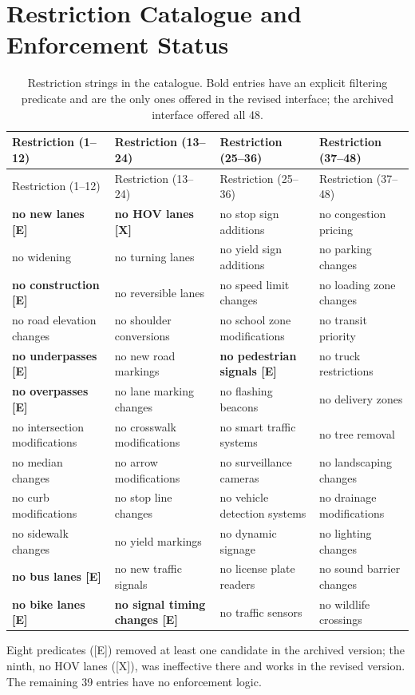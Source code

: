 \documentclass[11pt]{article}
\begin{document}
\section{Restriction Catalogue and Enforcement Status}
\setcounter{table}{0}
\begin{longtable}{P{0.21\textwidth} P{0.21\textwidth} P{0.21\textwidth} P{0.21\textwidth}}
\caption{Restriction strings in the catalogue. Bold entries have an explicit filtering predicate and are the only ones offered in the revised interface; the archived interface offered all 48.}\label{tab:restriction-catalogue}\\
\toprule Restriction (1--12) & Restriction (13--24) & Restriction (25--36) & Restriction (37--48) \\
\midrule
\endfirsthead
\toprule Restriction (1--12) & Restriction (13--24) & Restriction (25--36) & Restriction (37--48) \\
\midrule
\endhead
\textbf{no new lanes [E]} & \textbf{no HOV lanes [X]} & no stop sign additions & no congestion pricing \\
no widening & no turning lanes & no yield sign additions & no parking changes \\
\textbf{no construction [E]} & no reversible lanes & no speed limit changes & no loading zone changes \\
no road elevation changes & no shoulder conversions & no school zone modifications & no transit priority \\
\textbf{no underpasses [E]} & no new road markings & \textbf{no pedestrian signals [E]} & no truck restrictions \\
\textbf{no overpasses [E]} & no lane marking changes & no flashing beacons & no delivery zones \\
no intersection modifications & no crosswalk modifications & no smart traffic systems & no tree removal \\
no median changes & no arrow modifications & no surveillance cameras & no landscaping changes \\
no curb modifications & no stop line changes & no vehicle detection systems & no drainage modifications \\
no sidewalk changes & no yield markings & no dynamic signage & no lighting changes \\
\textbf{no bus lanes [E]} & no new traffic signals & no license plate readers & no sound barrier changes \\
\textbf{no bike lanes [E]} & \textbf{no signal timing changes [E]} & no traffic sensors & no wildlife crossings \\
\bottomrule
\end{longtable}
\noindent\footnotesize Eight predicates ([E]) removed at least one candidate in the archived version; the ninth, no HOV lanes ([X]), was ineffective there and works in the revised version. The remaining 39 entries have no enforcement logic.
\end{document}
